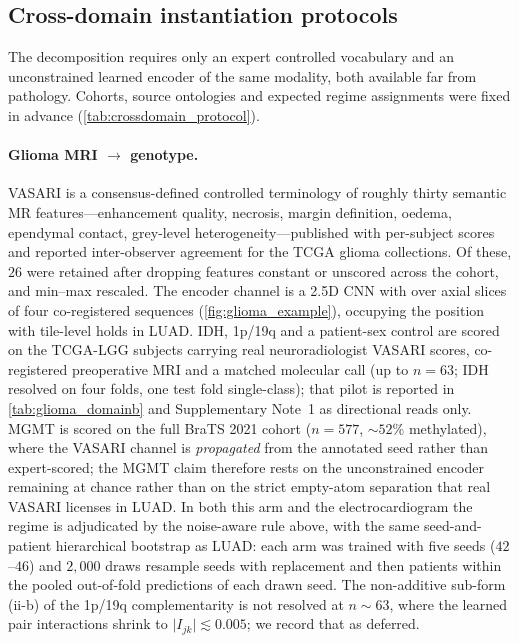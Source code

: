 \subsection*{Cross-domain instantiation protocols}


The decomposition requires only an expert controlled vocabulary and an
unconstrained learned encoder of the same modality, both available far
from pathology. Cohorts, source ontologies and expected regime
assignments were fixed in advance (\cref{tab:crossdomain_protocol}).

\paragraph{Glioma MRI $\rightarrow$ genotype.}
VASARI is a consensus-defined controlled terminology of roughly thirty
semantic MR features---enhancement quality, necrosis, margin definition,
oedema, ependymal contact, grey-level heterogeneity---published with
per-subject scores and reported inter-observer agreement for the TCGA
glioma collections.\cite{gutman2013vasari,vasari_tcia} Of these, $26$
were retained after dropping features constant or unscored across the
cohort, and min--max rescaled. The encoder channel is a 2.5D CNN with
\abmil{} over axial slices of four co-registered sequences
(\cref{fig:glioma_example}), occupying the
position \ctranspath{} with tile-level \abmil{} holds in LUAD. IDH,
1p/19q and a patient-sex control are scored on the TCGA-LGG subjects
carrying real neuroradiologist VASARI scores, co-registered preoperative
MRI and a matched molecular call (up to $n\!=\!63$; IDH resolved on four
folds, one test fold single-class); that pilot is reported in
\cref{tab:glioma_domainb} and Supplementary Note~1 as directional reads
only. MGMT is scored on the full BraTS 2021
cohort\cite{baid2021brats} ($n\!=\!577$, ${\sim}52\%$ methylated), where
the VASARI channel is \emph{propagated} from the annotated seed rather
than expert-scored; the MGMT claim therefore rests on the unconstrained
encoder remaining at chance rather than on the strict empty-atom
separation that real VASARI licenses in LUAD. In both this arm and the
electrocardiogram the regime is adjudicated by the noise-aware rule
above, with the same seed-and-patient hierarchical bootstrap as LUAD:
each arm was trained with five seeds ($42$--$46$) and $2{,}000$ draws
resample seeds with replacement and then patients within the pooled
out-of-fold predictions of each drawn seed. The non-additive sub-form
(ii-b) of the 1p/19q complementarity is not resolved at $n\!\sim\!63$,
where the learned pair interactions shrink to
$\lvert I_{jk}\rvert\!\lesssim\!0.005$; we record that as deferred.

